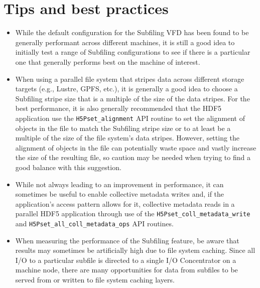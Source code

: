 \documentclass[../main.tex]{subfiles}
\begin{document}
\newpage

\section{Tips and best practices}

\begin{itemize}
\item While the default configuration for the Subfiling VFD has been found
to be generally performant across different machines, it is still a good
idea to initially test a range of Subfiling configurations to see if there
is a particular one that generally performs best on the machine of interest.

\item When using a parallel file system that stripes data across different
storage targets (e.g., Lustre, GPFS, etc.), it is generally a good idea to
choose a Subfiling stripe size that is a multiple of the size of the data
stripes. For the best performance, it is also generally recommended that
the HDF5 application use the \texttt{H5Pset\_alignment} API routine to set
the alignment of objects in the file to match the Subfiling stripe size or
to at least be a multiple of the size of the file system's data stripes.
However, setting the alignment of objects in the file can potentially waste
space and vastly increase the size of the resulting file, so caution may be
needed when trying to find a good balance with this suggestion.

\item While not always leading to an improvement in performance, it can
sometimes be useful to enable collective metadata writes and, if the application's
access pattern allows for it, collective metadata reads in a parallel HDF5
application through use of the \texttt{H5Pset\_coll\_metadata\_write} and
\texttt{H5Pset\_all\_coll\_metadata\_ops} API routines.

\item When measuring the performance of the Subfiling feature, be aware that
results may sometimes be artificially high due to file system caching.
Since all I/O to a particular subfile is directed to a single I/O Concentrator
on a machine node, there are many opportunities for data from subfiles to
be served from or written to file system caching layers.
\end{itemize}
\end{document}
